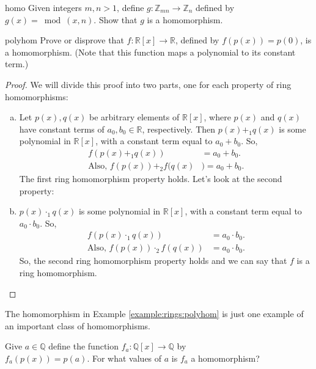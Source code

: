 \begin{exercise}{homo}
Given integers $m,n>1$, define $g:{\mathbb Z}_{mn}\rightarrow {\mathbb Z}_n$ defined by $g(x)=\bmod(x,n)$.  Show that $g$ is a homomorphism.
\end{exercise}

\begin{example}{polyhom}
Prove or disprove that $f:{\mathbb R}[x]\rightarrow{\mathbb R}$, defined by $f(p(x))=p(0)$, is a homomorphism.  (Note that this function maps a polynomial to its constant term.)

\begin{proof}
We will divide this proof into two parts, one for each property of ring homomorphisms:
\begin{enumerate}[(a)]
\item Let $p(x),q(x)$ be arbitrary elements of ${\mathbb R}[x]$, where $p(x)$ and $q(x)$ have constant terms of $a_0,b_0\in {\mathbb R}$, respectively.  Then $p(x)+_1q(x)$ is some polynomial in ${\mathbb R}[x]$, with a constant term equal to $a_0+b_0$.  So,
\begin{align*}
f(p(x)+_1q(x))&=a_0+b_0.\\
\text{Also, } f(p(x))+_2f(q(x)&)=a_0+b_0.
\end{align*}
The first ring homomorphism property holds.  Let's look at the second property:
\item  $p(x)\cdot_1q(x)$ is some polynomial in ${\mathbb R}[x]$, with a constant term equal to $a_0\cdot b_0$.  So,
\begin{align*}
f(p(x)\cdot_1q(x))&=a_0\cdot b_0.\\
\text{Also, }f(p(x))\cdot_2f(q(x))&=a_0\cdot b_0.
\end{align*}
So, the second ring homomorphism property holds and we can say that $f$ is a ring homomorphism.
\end{enumerate}
\end{proof}
\end{example}
The homomorphism in Example \ref{example:rings:polyhom} is just one example of an important class of homomorphisms.  

\begin{exercise}{}
Give $a\in{\mathbb Q}$ define the function $f_a:  {\mathbb Q}[x]\rightarrow{\mathbb Q}$ by\\ $f_a(p(x))=p(a)$.  For what values of $a$ is $f_a$ a homomorphism?
\end{exercise}

